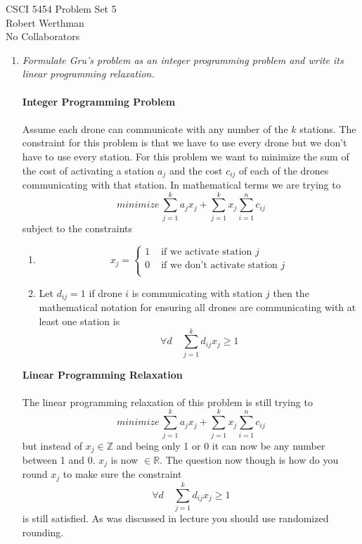 \documentclass[12pt]{article}
\begin{document}
CSCI 5454 \hfill Problem Set 5\\
Robert Werthman\\
No Collaborators

\hrulefill

\begin{enumerate}
  
  \item \textit{Formulate Gru's problem as an integer programming problem and
  write its linear programming relaxation.}\\
  \\
  \textbf{Integer Programming Problem}\\
  \\
  Assume each drone can communicate with any number of the $k$ stations. The
  constraint for this problem is that we have to use every drone but we don't
  have to use every station.  For this problem we want to minimize the sum of
  the cost of activating a station $a_j$ and the cost $c_{ij}$ of each of the
  drones communicating with that station.  In mathematical terms we are trying to 
  $$ 
  minimize\,\sum_{j=1}^{k} a_jx_j + \sum_{j = 1}^{k} x_j\sum_{i=1}^{n} c_{ij}
  $$ 
  subject to the constraints
  \begin{enumerate} 
  \item
  $$
  x_j = 
  \begin{cases}
  1 & \text{ if we activate station }j\\
  0 & \text{ if we don't activate station }j\\
  \end{cases}
  $$
  \item
  Let $d_{ij} = 1$ if drone $i$ is communicating with station $j$ 
  then the mathematical notation for ensuring all drones are communicating with
  at least one station is 
  $$
  \forall d \quad \sum_{j=1}^{k} d_{ij}x_j \ge 1
  $$
  \end{enumerate}

  \textbf{Linear Programming Relaxation}\\
  \\
  The linear programming relaxation of this problem is still trying to
  $$ 
  minimize\,\sum_{j=1}^{k} a_jx_j + \sum_{j = 1}^{k} x_j\sum_{i=1}^{n} c_{ij}
  $$
  but instead of $x_j \in \mathbb{Z}$ and being only 1 or 0 it can now be any
  number between 1 and 0.  $x_j$ is now $\in \mathbb{R}$.  The question now
  though is how do you round $x_j$ to make sure the constraint
  $$
  \forall d \quad \sum_{j=1}^{k} d_{ij}x_j \ge 1
  $$
  is still satisfied.  As was discussed in lecture you should use randomized
  rounding.
  

\end{enumerate}
\end{document}
